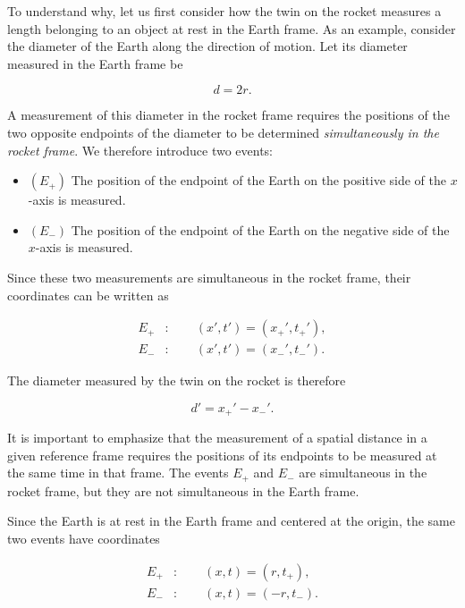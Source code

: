 \documentclass[12pt]{article}
\begin{document}
To understand why, let us first consider how the twin on the rocket measures a length
belonging to an object at rest in the Earth frame. As an example, consider the diameter
of the Earth along the direction of motion. Let its diameter measured in the Earth frame
be

\[
  d=2r.
\]

A measurement of this diameter in the rocket frame requires the positions of the two
opposite endpoints of the diameter to be determined \textit{simultaneously in the
rocket frame}. We therefore introduce two events:

\begin{itemize}
  \item $(E_+)$ The position of the endpoint of the Earth on the positive side of the
  $x$-axis is measured.

  \item $(E_-)$ The position of the endpoint of the Earth on the negative side of the
  $x$-axis is measured.
\end{itemize}

Since these two measurements are simultaneous in the rocket frame, their coordinates
can be written as

\begin{equation}
  \begin{aligned}
    E_+ &: \qquad (x',t')=(x_+',t_+'), \\
    E_- &: \qquad (x',t')=(x_-',t_-').
  \end{aligned}
  \label{eq:earth_diameter_events_rocket}
\end{equation}

The diameter measured by the twin on the rocket is therefore

\begin{equation}
  d'=x_+'-x_-'.
  \label{eq:earth_diameter_rocket_definition}
\end{equation}

It is important to emphasize that the measurement of a spatial distance in a given
reference frame requires the positions of its endpoints to be measured at the same
time in that frame. The events $E_+$ and $E_-$ are simultaneous in the rocket frame,
but they are not simultaneous in the Earth frame. \par

Since the Earth is at rest in the Earth frame and centered at the origin, the same two
events have coordinates

\begin{equation}
  \begin{aligned}
    E_+ &: \qquad (x,t)=(r,t_+), \\
    E_- &: \qquad (x,t)=(-r,t_-).
  \end{aligned}
  \label{eq:earth_diameter_events_earth}
\end{equation}
\end{document}
